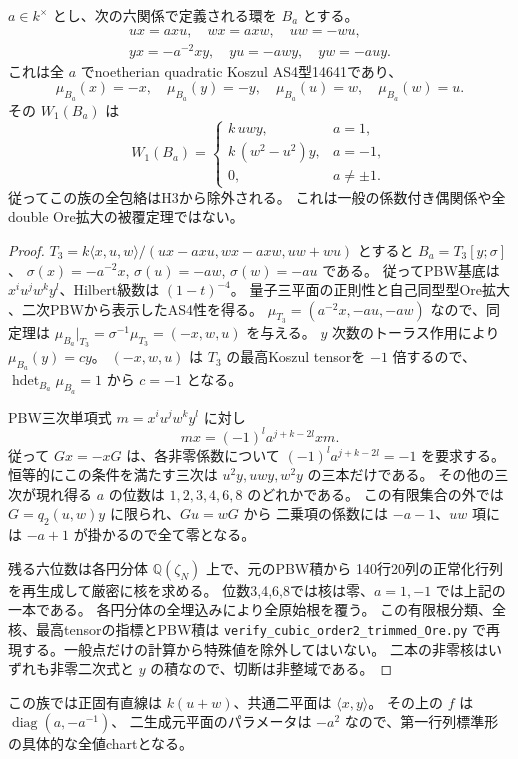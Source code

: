 \begin{theorem}[共通二平面から出る一パラメータ単項Ore族の全排除]
\label{thm:h3-order2-monomial-Ore-excluded}
$a\in k^\times$ とし、次の六関係で定義される環を $B_a$ とする。
\[
\begin{gathered}
 ux=axu,\quad wx=axw,\quad uw=-wu,\\
 yx=-a^{-2}xy,\quad yu=-awy,\quad yw=-auy.
\end{gathered}
\]
これは全 $a$ でnoetherian quadratic Koszul AS4型14641であり、
\[
 \mu_{B_a}(x)=-x,\quad \mu_{B_a}(y)=-y,\quad
 \mu_{B_a}(u)=w,\quad\mu_{B_a}(w)=u.
\]
その $W_1(B_a)$ は
\[
 W_1(B_a)=
 \begin{cases}
  k\,uwy,&a=1,\\
  k\,(w^2-u^2)y,&a=-1,\\
  0,&a\ne\pm1.
 \end{cases}
\]
従ってこの族の全包絡はH3から除外される。
これは一般の係数付き偶関係や全double Ore拡大の被覆定理ではない。
\end{theorem}
\begin{proof}
$T_3=k\langle x,u,w\rangle/(ux-axu,wx-axw,uw+wu)$ とすると
$B_a=T_3[y;\sigma]$、
$\sigma(x)=-a^{-2}x$, $\sigma(u)=-aw$, $\sigma(w)=-au$ である。
従ってPBW基底は $x^iu^jw^ky^l$、Hilbert級数は $(1-t)^{-4}$。
量子三平面の正則性と自己同型型Ore拡大
\cite[Theorem 3.3]{LWWOre}、二次PBWから表示したAS4性を得る。
$\mu_{T_3}=(a^{-2}x,-au,-aw)$ なので、同定理は
$\mu_{B_a}|_{T_3}=\sigma^{-1}\mu_{T_3}=(-x,w,u)$ を与える。
$y$ 次数のトーラス作用により $\mu_{B_a}(y)=cy$。
$(-x,w,u)$ は $T_3$ の最高Koszul tensorを $-1$ 倍するので、
$\operatorname{hdet}_{B_a}\mu_{B_a}=1$ から $c=-1$ となる。

PBW三次単項式 $m=x^iu^jw^ky^l$ に対し
\[
 mx=(-1)^l a^{j+k-2l}xm.
\]
従って $Gx=-xG$ は、各非零係数について
$(-1)^l a^{j+k-2l}=-1$ を要求する。
恒等的にこの条件を満たす三次は $u^2y,uwy,w^2y$ の三本だけである。
その他の三次が現れ得る $a$ の位数は $1,2,3,4,6,8$ のどれかである。
この有限集合の外では $G=q_2(u,w)y$ に限られ、$Gu=wG$ から
二乗項の係数には $-a-1$、$uw$ 項には $-a+1$ が掛かるので全て零となる。

残る六位数は各円分体 $\mathbb Q(\zeta_N)$ 上で、元のPBW積から
140行20列の正常化行列を再生成して厳密に核を求める。
位数3,4,6,8では核は零、$a=1,-1$ では上記の一本である。
各円分体の全埋込みにより全原始根を覆う。
この有限根分類、全核、最高tensorの指標とPBW積は
\texttt{verify\_\allowbreak{}cubic\_\allowbreak{}order2\_\allowbreak{}trimmed\_\allowbreak{}Ore.py}
で再現する。一般点だけの計算から特殊値を除外してはいない。
二本の非零核はいずれも非零二次式と $y$ の積なので、切断は非整域である。
\end{proof}
この族では正固有直線は $k(u+w)$、共通二平面は $\langle x,y\rangle$。
その上の $f$ は $\operatorname{diag}(a,-a^{-1})$、
二生成元平面のパラメータは $-a^2$ なので、第一行列標準形の具体的な全値chartとなる。

